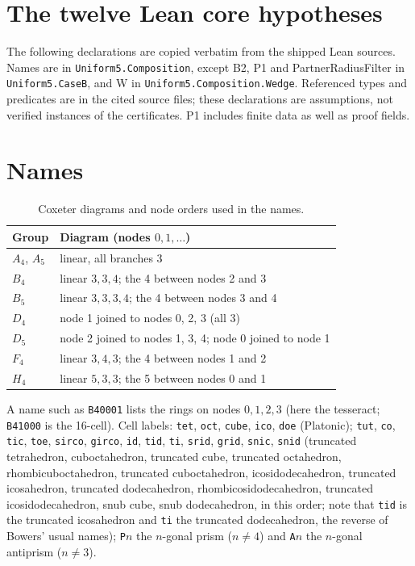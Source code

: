 \documentclass[11pt]{article}
\theoremstyle{definition}
\theoremstyle{remark}
\begin{document}
\begin{appendices}
\section{The twelve Lean core hypotheses}\label{app:lean-inputs}
The following declarations are copied verbatim from the shipped Lean sources.
Names are in \texttt{Uniform5.Composition}, except B2, P1 and
PartnerRadiusFilter in \texttt{Uniform5.CaseB}, and W in
\texttt{Uniform5.Composition.Wedge}. Referenced types and predicates are
in the cited source files; these declarations are assumptions, not verified
instances of the certificates. P1 includes finite data as well as proof fields.

\section{Names}\label{app:names}

\begin{table}[ht]
\centering\small
\caption{Coxeter diagrams and node orders used in the names.}\label{tab:names}
\begin{tabular}{@{}ll@{}}
\toprule
Group & Diagram (nodes $0,1,\dots$)\\
\midrule
$A_4$, $A_5$ & linear, all branches 3\\
$B_4$ & linear $3,3,4$; the 4 between nodes 2 and 3\\
$B_5$ & linear $3,3,3,4$; the 4 between nodes 3 and 4\\
$D_4$ & node 1 joined to nodes 0, 2, 3 (all 3)\\
$D_5$ & node 2 joined to nodes 1, 3, 4; node 0 joined to node 1\\
$F_4$ & linear $3,4,3$; the 4 between nodes 1 and 2\\
$H_4$ & linear $5,3,3$; the 5 between nodes 0 and 1\\
\bottomrule
\end{tabular}
\end{table}

A name such as \texttt{B40001} lists the rings on nodes $0,1,2,3$ (here
the tesseract; \texttt{B41000} is the 16-cell). Cell labels: \texttt{tet},
\texttt{oct}, \texttt{cube}, \texttt{ico}, \texttt{doe} (Platonic);
\texttt{tut}, \texttt{co}, \texttt{tic}, \texttt{toe}, \texttt{sirco},
\texttt{girco}, \texttt{id}, \texttt{tid}, \texttt{ti}, \texttt{srid},
\texttt{grid}, \texttt{snic}, \texttt{snid} (truncated tetrahedron,
cuboctahedron, truncated cube, truncated octahedron, rhombicuboctahedron,
truncated cuboctahedron, icosidodecahedron, truncated icosahedron,
truncated dodecahedron, rhombicosidodecahedron, truncated
icosidodecahedron, snub cube, snub dodecahedron, in this order; note that
\texttt{tid} is the truncated icosahedron and \texttt{ti} the truncated
dodecahedron, the reverse of Bowers' usual names); \texttt{P}$n$ the
$n$-gonal prism ($n\ne4$) and \texttt{A}$n$ the $n$-gonal antiprism
($n\ne3$).


\end{appendices}
\end{document}
